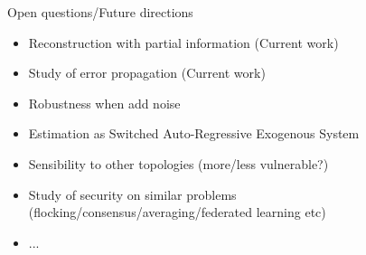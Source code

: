 \documentclass[handout,aspectratio=169]{beamer}
\begin{document}
\begin{frame}{Open questions/Future directions}
    \begin{itemize}[<+->]
      \item Reconstruction with partial information (Current work)
      \item Study of error propagation (Current work)
      \item Robustness when add noise
      \item Estimation as Switched Auto-Regressive Exogenous System
      \item Sensibility to other topologies (more/less vulnerable?)
      \item Study of security on similar problems (flocking/consensus/averaging/federated learning etc)
      \item ...
    \end{itemize}
\end{frame}


\end{document}
